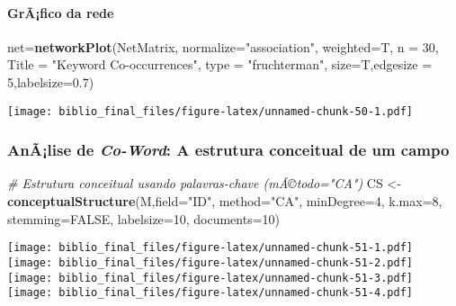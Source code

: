 \documentclass[]{article}
\newenvironment{Shaded}{\begin{snugshade}}{\end{snugshade}}
\newcommand{\KeywordTok}[1]{\textcolor[rgb]{0.13,0.29,0.53}{\textbf{#1}}}
\newcommand{\DataTypeTok}[1]{\textcolor[rgb]{0.13,0.29,0.53}{#1}}
\newcommand{\DecValTok}[1]{\textcolor[rgb]{0.00,0.00,0.81}{#1}}
\newcommand{\FloatTok}[1]{\textcolor[rgb]{0.00,0.00,0.81}{#1}}
\newcommand{\StringTok}[1]{\textcolor[rgb]{0.31,0.60,0.02}{#1}}
\newcommand{\CommentTok}[1]{\textcolor[rgb]{0.56,0.35,0.01}{\textit{#1}}}
\newcommand{\OtherTok}[1]{\textcolor[rgb]{0.56,0.35,0.01}{#1}}
\newcommand{\NormalTok}[1]{#1}
\let\oldparagraph\paragraph
\renewcommand{\paragraph}[1]{\oldparagraph{#1}\mbox{}}
\begin{document}
\paragraph{GrÃ¡fico da rede}\label{grafico-da-rede-2}

\begin{Shaded}
\begin{Highlighting}[]
\NormalTok{net=}\KeywordTok{networkPlot}\NormalTok{(NetMatrix, }\DataTypeTok{normalize=}\StringTok{"association"}\NormalTok{, }\DataTypeTok{weighted=}\NormalTok{T, }\DataTypeTok{n =} \DecValTok{30}\NormalTok{, }\DataTypeTok{Title =} \StringTok{"Keyword Co-occurrences"}\NormalTok{, }\DataTypeTok{type =} \StringTok{"fruchterman"}\NormalTok{, }\DataTypeTok{size=}\NormalTok{T,}\DataTypeTok{edgesize =} \DecValTok{5}\NormalTok{,}\DataTypeTok{labelsize=}\FloatTok{0.7}\NormalTok{)}
\end{Highlighting}
\end{Shaded}

\texttt{[image: biblio\_final\_files/figure-latex/unnamed-chunk-50-1.pdf]}

\subsubsection{\texorpdfstring{AnÃ¡lise de \emph{Co-Word}: A estrutura
conceitual de um
campo}{AnÃ¡lise de Co-Word: A estrutura conceitual de um campo}}\label{analise-de-co-word-a-estrutura-conceitual-de-um-campo}

\begin{Shaded}
\begin{Highlighting}[]
\CommentTok{# Estrutura conceitual usando palavras-chave (mÃ©todo="CA")}
\NormalTok{CS <-}\StringTok{ }\KeywordTok{conceptualStructure}\NormalTok{(M,}\DataTypeTok{field=}\StringTok{"ID"}\NormalTok{, }\DataTypeTok{method=}\StringTok{"CA"}\NormalTok{, }\DataTypeTok{minDegree=}\DecValTok{4}\NormalTok{, }\DataTypeTok{k.max=}\DecValTok{8}\NormalTok{, }\DataTypeTok{stemming=}\OtherTok{FALSE}\NormalTok{, }\DataTypeTok{labelsize=}\DecValTok{10}\NormalTok{, }\DataTypeTok{documents=}\DecValTok{10}\NormalTok{)}
\end{Highlighting}
\end{Shaded}

\texttt{[image: biblio\_final\_files/figure-latex/unnamed-chunk-51-1.pdf]}
\texttt{[image: biblio\_final\_files/figure-latex/unnamed-chunk-51-2.pdf]}
\texttt{[image: biblio\_final\_files/figure-latex/unnamed-chunk-51-3.pdf]}
\texttt{[image: biblio\_final\_files/figure-latex/unnamed-chunk-51-4.pdf]}
\end{document}
